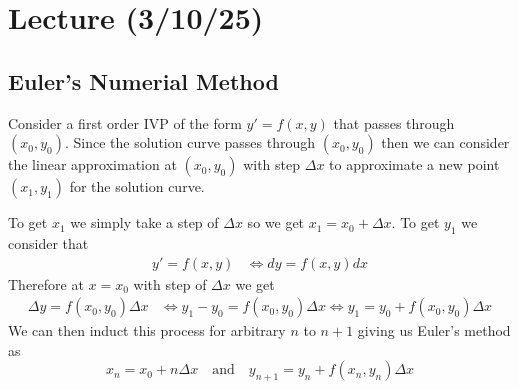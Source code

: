 \documentclass[notes]{subfiles}
\begin{document}
\setcounter{section}{14}
\section{Lecture (3/10/25)}

\subsection{Euler's Numerial Method}
Consider a first order IVP of the form $y' = f(x, y)$ that passes through $(x_0, y_0)$. Since the solution curve passes through $(x_0, y_0)$ then we can consider the linear approximation at $(x_0, y_0)$ with step $\Delta x$ to approximate a new point $(x_1, y_1)$ for the solution curve.

To get $x_1$ we simply take a step of $\Delta x$ so we get $x_1 = x_0 + \Delta x$.
To get $y_1$ we consider that
\begin{align*}
    y' = f(x, y)
    &\iff dy = f(x, y)dx
\end{align*}
Therefore at $x = x_0$ with step of $\Delta x$ we get
\begin{align*}
    \Delta y = f(x_0, y_0)\Delta x
    &\iff y_1 - y_0 = f(x_0, y_0)\Delta x
    \iff y_1 = y_0 + f(x_0, y_0)\Delta x
\end{align*}
We can then induct this process for arbitrary $n$ to $n + 1$ giving us Euler's method as
\begin{equation} \label{euler_num_method}
    x_n = x_0 + n\Delta x \quad \text{and} \quad y_{n + 1} = y_n + f(x_n, y_n)\Delta x
\end{equation}
\end{document}
